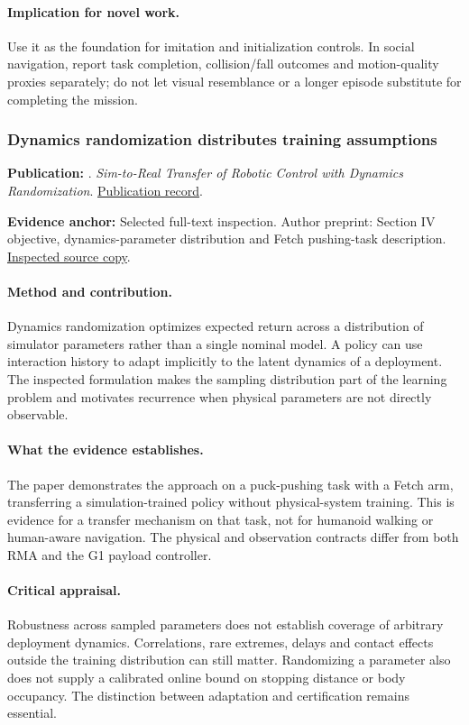 \paragraph{Implication for novel work.} Use it as the foundation for imitation and initialization controls. In social navigation, report task completion, collision/fall outcomes and motion-quality proxies separately; do not let visual resemblance or a longer episode substitute for completing the mission.

\subsubsection{Dynamics randomization distributes training assumptions}\label{paper:domain}
\textbf{Publication:} \citet{domain}. \emph{Sim-to-Real Transfer of Robotic Control with Dynamics Randomization}. \href{https://doi.org/10.1109/icra.2018.8460528}{Publication record}.

\textbf{Evidence anchor:} Selected full-text inspection. Author preprint: Section IV objective, dynamics-parameter distribution and Fetch pushing-task description. \href{https://arxiv.org/pdf/1710.06537}{Inspected source copy}.

\paragraph{Method and contribution.} Dynamics randomization optimizes expected return across a distribution of simulator parameters rather than a single nominal model. A policy can use interaction history to adapt implicitly to the latent dynamics of a deployment. The inspected formulation makes the sampling distribution part of the learning problem and motivates recurrence when physical parameters are not directly observable.

\paragraph{What the evidence establishes.} The paper demonstrates the approach on a puck-pushing task with a Fetch arm, transferring a simulation-trained policy without physical-system training. This is evidence for a transfer mechanism on that task, not for humanoid walking or human-aware navigation. The physical and observation contracts differ from both RMA and the G1 payload controller.

\paragraph{Critical appraisal.} Robustness across sampled parameters does not establish coverage of arbitrary deployment dynamics. Correlations, rare extremes, delays and contact effects outside the training distribution can still matter. Randomizing a parameter also does not supply a calibrated online bound on stopping distance or body occupancy. The distinction between adaptation and certification remains essential.


